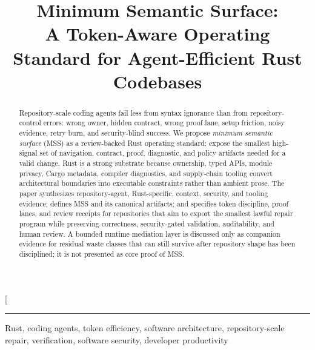 \documentclass[conference]{IEEEtran}
\title{Minimum Semantic Surface:\\A Token-Aware Operating Standard for Agent-Efficient Rust Codebases}
\author{
\IEEEauthorblockN{Jepson Taylor}
\IEEEauthorblockA{
\textit{Research Group}\\
\textit{VEOX Inc.}\\
jepson@veox.ai
}
}
\newcommand{\mss}{\textnormal{\textsc{MSS}}}
\begin{document}
\makeatletter
\twocolumn[{%
\begin{@twocolumnfalse}%

\maketitle

\vspace{-2pt}
\noindent\textcolor{accent}{\rule{\linewidth}{0.7pt}}\par
\vspace{4pt}

\begin{abstract}
\noindent Repository-scale coding agents fail less from syntax ignorance than from repository-control errors: wrong owner, hidden contract, wrong proof lane, setup friction, noisy evidence, retry burn, and security-blind success. We propose \emph{minimum semantic surface} (\mss) as a review-backed Rust operating standard: expose the smallest high-signal set of navigation, contract, proof, diagnostic, and policy artifacts needed for a valid change. Rust is a strong substrate because ownership, typed APIs, module privacy, Cargo metadata, compiler diagnostics, and supply-chain tooling convert architectural boundaries into executable constraints rather than ambient prose. The paper synthesizes repository-agent, Rust-specific, context, security, and tooling evidence; defines \mss{} and its canonical artifacts; and specifies token discipline, proof lanes, and review receipts for repositories that aim to export the smallest lawful repair program while preserving correctness, security-gated validation, auditability, and human review. A bounded runtime mediation layer is discussed only as companion evidence for residual waste classes that can still survive after repository shape has been disciplined; it is not presented as core proof of \mss{}.
\end{abstract}

\begin{IEEEkeywords}
\noindent Rust, coding agents, token efficiency, software architecture, repository-scale repair, verification, software security, developer productivity
\end{IEEEkeywords}


\end{@twocolumnfalse}}
\end{document}
